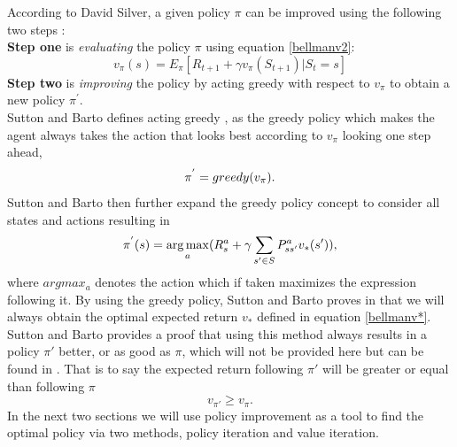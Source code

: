 According to David Silver, a given policy $\pi$ can be improved using the following two steps \cite{David_Silver}:\\
\textbf{Step one} is \textit{evaluating} the policy $\pi$ using equation \ref{bellmanv2}: \[v_{\pi}(s) = E_{\pi}[R_{t+1} + \gamma v_{\pi}(S_{t+1})|S_t = s]\]
\textbf{Step two} is \textit{improving} the policy by acting greedy with respect to $v_\pi$ to obtain a new policy $\pi^{'}$.\\
Sutton and Barto defines acting greedy \cite{sutton_barto}, as the greedy policy which makes the agent always takes the action that looks best according to $v_\pi$ looking one step ahead, 
\begin{equation}
	\pi^{'} = greedy(v_{\pi}).
	\label{pi'}\\
\end{equation}
Sutton and Barto then further expand the greedy policy concept to consider all states and actions resulting in
\begin{equation}
	\pi^{'}(s) = \operatorname*{arg\,max}\limits_{a}(R^{a}_s+\gamma\sum_{s'\in S}P^{a}_{ss'}v_*(s')) ,
	\label{pi'(s)}
\end{equation}
where $argmax_a$ denotes the action which if taken maximizes the expression following it.
By using the greedy policy, Sutton and Barto proves in \cite{sutton_barto} that we will always obtain the optimal expected return $v_*$ defined in equation \ref{bellmanv*}.\\
Sutton and Barto provides a proof that using this method always results in a policy $\pi'$ better, or as good as $\pi$, which will not be provided here but can be found in \cite{sutton_barto}. That is to say the expected return following $\pi'$ will be greater or equal than following $\pi$
\begin{equation}
	v_{\pi'} \ge v_{\pi}.
\end{equation}
In the next two sections we will use policy improvement as a tool to find the optimal policy via two methods, policy iteration and value iteration.
